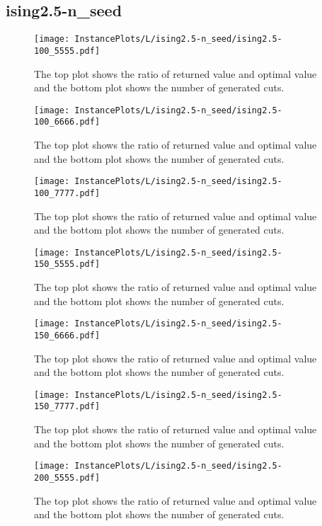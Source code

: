 \documentclass[10pt,a4paper]{article}
\begin{document}
\subsection{ising2.5-n\_seed}
\begin{figure}[H]
\texttt{[image: InstancePlots/L/ising2.5-n\_seed/ising2.5-100\_5555.pdf]}
\caption{The top plot shows the ratio of returned value and optimal value     and the bottom plot shows the number of generated cuts.}
\end{figure}

\begin{figure}[H]
\texttt{[image: InstancePlots/L/ising2.5-n\_seed/ising2.5-100\_6666.pdf]}
\caption{The top plot shows the ratio of returned value and optimal value     and the bottom plot shows the number of generated cuts.}
\end{figure}

\begin{figure}[H]
\texttt{[image: InstancePlots/L/ising2.5-n\_seed/ising2.5-100\_7777.pdf]}
\caption{The top plot shows the ratio of returned value and optimal value     and the bottom plot shows the number of generated cuts.}
\end{figure}

\begin{figure}[H]
\texttt{[image: InstancePlots/L/ising2.5-n\_seed/ising2.5-150\_5555.pdf]}
\caption{The top plot shows the ratio of returned value and optimal value     and the bottom plot shows the number of generated cuts.}
\end{figure}

\begin{figure}[H]
\texttt{[image: InstancePlots/L/ising2.5-n\_seed/ising2.5-150\_6666.pdf]}
\caption{The top plot shows the ratio of returned value and optimal value     and the bottom plot shows the number of generated cuts.}
\end{figure}

\begin{figure}[H]
\texttt{[image: InstancePlots/L/ising2.5-n\_seed/ising2.5-150\_7777.pdf]}
\caption{The top plot shows the ratio of returned value and optimal value     and the bottom plot shows the number of generated cuts.}
\end{figure}

\begin{figure}[H]
\texttt{[image: InstancePlots/L/ising2.5-n\_seed/ising2.5-200\_5555.pdf]}
\caption{The top plot shows the ratio of returned value and optimal value     and the bottom plot shows the number of generated cuts.}
\end{figure}
\end{document}
